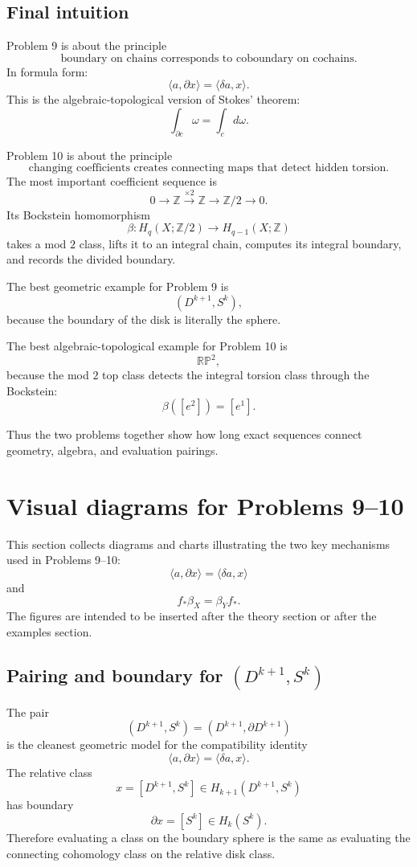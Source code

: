 \documentclass[12pt,a4paper]{article}
\theoremstyle{notespace}
\begin{document}
\subsection{Final intuition}

Problem 9 is about the principle
\[
\boxed{
	\text{boundary on chains corresponds to coboundary on cochains.}
}
\]
In formula form:
\[
\boxed{
	\langle a,\partial x\rangle=\langle \delta a,x\rangle.
}
\]
This is the algebraic-topological version of Stokes' theorem:
\[
\int_{\partial c}\omega=\int_c d\omega.
\]

Problem 10 is about the principle
\[
\boxed{
	\text{changing coefficients creates connecting maps that detect hidden torsion.}
}
\]
The most important coefficient sequence is
\[
0\longrightarrow \mathbb Z
\xrightarrow{\times 2}
\mathbb Z
\longrightarrow
\mathbb Z/2
\longrightarrow 0.
\]
Its Bockstein homomorphism
\[
\beta:H_q(X;\mathbb Z/2)
\longrightarrow
H_{q-1}(X;\mathbb Z)
\]
takes a mod \(2\) class, lifts it to an integral chain, computes its integral boundary, and records the divided boundary.

The best geometric example for Problem 9 is
\[
(D^{k+1},S^k),
\]
because the boundary of the disk is literally the sphere.

The best algebraic-topological example for Problem 10 is
\[
\mathbb{RP}^2,
\]
because the mod \(2\) top class detects the integral torsion class through the Bockstein:
\[
\boxed{
	\beta([e^2])=[e^1].
}
\]

Thus the two problems together show how long exact sequences connect geometry, algebra, and evaluation pairings.


\section{Visual diagrams for Problems 9--10}

This section collects diagrams and charts illustrating the two key mechanisms used in Problems 9--10:
\[
\langle a,\partial x\rangle=\langle \delta a,x\rangle
\]
and
\[
f_*\beta_X=\beta_Yf_*.
\]
The figures are intended to be inserted after the theory section or after the examples section.

\subsection{Pairing and boundary for \texorpdfstring{$(D^{k+1},S^k)$}{(D^{k+1}, S^k)}}

The pair
\[
(D^{k+1},S^k)=(D^{k+1},\partial D^{k+1})
\]
is the cleanest geometric model for the compatibility identity
\[
\langle a,\partial x\rangle=\langle \delta a,x\rangle .
\]
The relative class
\[
x=[D^{k+1},S^k]\in H_{k+1}(D^{k+1},S^k)
\]
has boundary
\[
\partial x=[S^k]\in H_k(S^k).
\]
Therefore evaluating a class on the boundary sphere is the same as evaluating the connecting cohomology class on the relative disk class.
\end{document}
